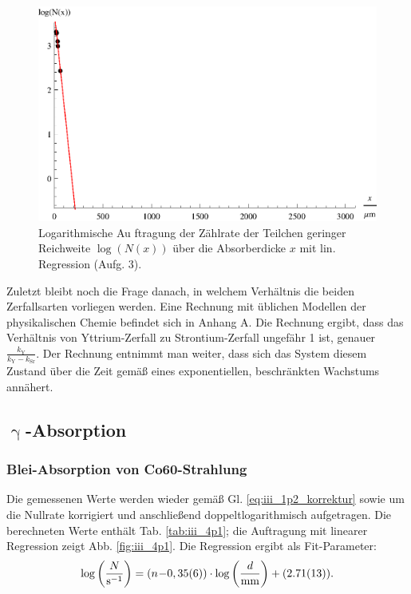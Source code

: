 \begin{figure}[tb]
	\centering
	\includegraphics[scale=1.0]{fig/iii_3_plotc.eps}
	\caption{Logarithmische Au
	ftragung der Zählrate der Teilchen geringer Reichweite $\log(N(x))$ über die Absorberdicke $x$ mit lin. Regression (Aufg. 3).}
	\label{fig:iii_3_plotc}
\end{figure}

Zuletzt bleibt noch die Frage danach, in welchem Verhältnis die beiden Zerfallsarten vorliegen werden. Eine Rechnung mit üblichen Modellen der physikalischen Chemie befindet sich in Anhang A.
Die Rechnung ergibt, dass das Verhältnis von Yttrium-Zerfall zu Strontium-Zerfall ungefähr 1 ist, genauer $\frac{k_\mathrm{Y}}{k_\mathrm{Y} - k_\mathrm{Sr}}$. Der Rechnung entnimmt man weiter, dass sich das System diesem Zustand über die Zeit gemäß eines exponentiellen, beschränkten Wachstums annähert.

\FloatBarrier
\subsection{\texorpdfstring{$\upgamma$}{Gamma}-Absorption}
\subsubsection{Blei-Absorption von Co60-Strahlung}
Die gemessenen Werte werden wieder gemäß Gl. \eqref{eq:iii_1p2_korrektur} sowie um die Nullrate korrigiert und anschließend doppeltlogarithmisch aufgetragen. Die berechneten Werte enthält Tab. \ref{tab:iii_4p1}; die Auftragung mit linearer Regression zeigt Abb. \ref{fig:iii_4p1}. Die Regression ergibt als Fit-Parameter:
\begin{equation}
\log\left(\frac{N}{\si{\per\second}}\right) = (\numb{-0,35(6)}) \cdot \log\left(\frac{d}{\si{mm}}\right) + (\num{2,71(13)}).
\end{equation}

